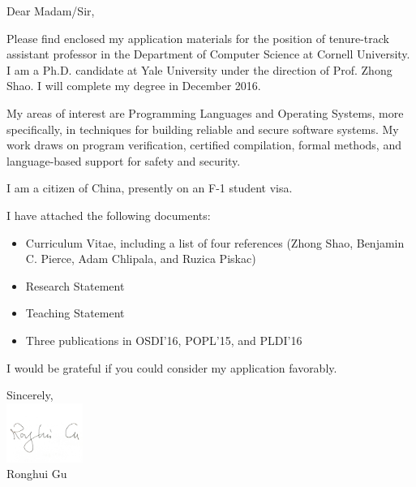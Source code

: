 \documentclass{letter}
\date{December 1, 2016}
\makeatletter
\newcommand{\subject}[1]{\def\@subject{{\centering{#1}}}}
\makeatother
\begin{document}
\begin{letter}{}

\subject{\begin{center} Re: Application for the position of tenure-track assistant professor\end{center}}


\opening{Dear Madam/Sir,}
Please find enclosed my application materials for the position of
tenure-track assistant professor in the Department of Computer Science at Cornell University. 
I am a Ph.D. candidate at Yale University under
the direction of Prof. Zhong Shao. I will complete my degree in December 2016.


My areas of interest are Programming Languages and Operating Systems,
more specifically, in techniques for building reliable and secure software systems. My work draws on program verification,
certified compilation, formal methods, and language-based support for safety and security.

I am a citizen of China, presently on an F-1 student visa.

I have attached the following documents:
\begin{itemize}
\item  Curriculum Vitae, including a list of four references (Zhong Shao, Benjamin C. Pierce, Adam Chlipala, and Ruzica Piskac)
\item Research Statement
\item Teaching Statement 
\item Three publications in OSDI'16, POPL'15, and PLDI'16
\end{itemize}

I would be grateful if you could consider my application favorably.




\closing{Sincerely,\\
\vspace{3pt}
\includegraphics[width=2.5cm]{signature.pdf}\\
Ronghui Gu
}

\end{letter}
\end{document}
